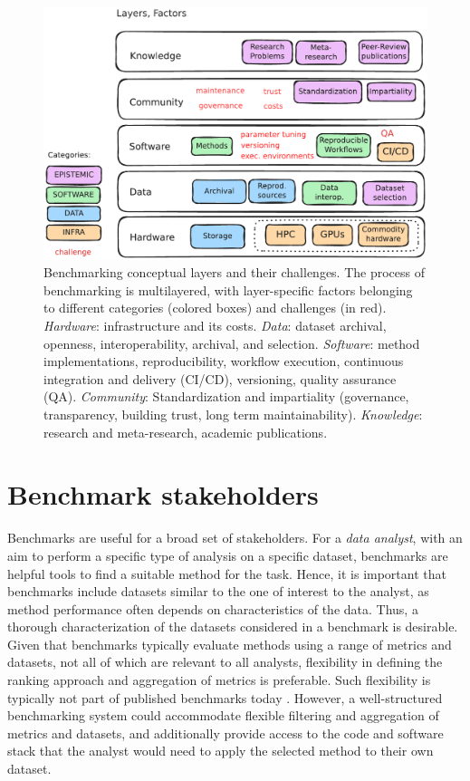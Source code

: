 \documentclass[11pt]{article}
\begin{document}
\begin{figure}
    \centering
    \includegraphics[width=0.8\linewidth]{figures/bens_layers.pdf}
    \caption[Benchmarking conceptual layers and their challenges.]{Benchmarking conceptual layers and their challenges. The process of benchmarking is multilayered, with layer-specific factors belonging to different categories (colored boxes) and challenges (in red). \emph{Hardware}: infrastructure and its costs. \emph{Data}: dataset archival, openness, interoperability, archival, and selection.  \emph{Software}: method implementations, reproducibility, workflow execution, continuous integration and delivery (CI/CD), versioning, quality assurance (QA). \emph{Community}: Standardization and impartiality (governance, transparency, building trust, long term maintainability). \emph{Knowledge}: research and meta-research, academic publications.}
    \label{fig:layers}
\end{figure}

\section*{Benchmark stakeholders}

Benchmarks are useful for a broad set of stakeholders. For a \emph{data analyst}, with an aim to perform a specific type of analysis on a specific dataset, benchmarks are helpful tools to find a suitable method for the task. Hence, it is important that benchmarks include datasets similar to the one of interest to the analyst, as method performance often depends on characteristics of the data. Thus, a thorough characterization of the datasets considered in a benchmark is desirable. Given that benchmarks typically evaluate methods using a range of metrics and datasets, not all of which are relevant to all analysts, flexibility in defining the ranking approach and aggregation of metrics is preferable. Such flexibility is typically not part of published benchmarks today \cite{Sonrel2023-te}. However, a well-structured benchmarking system could accommodate flexible filtering and aggregation of metrics and datasets, and additionally provide access to the code and software stack that the analyst would need to apply the selected method to their own dataset. 
\end{document}
